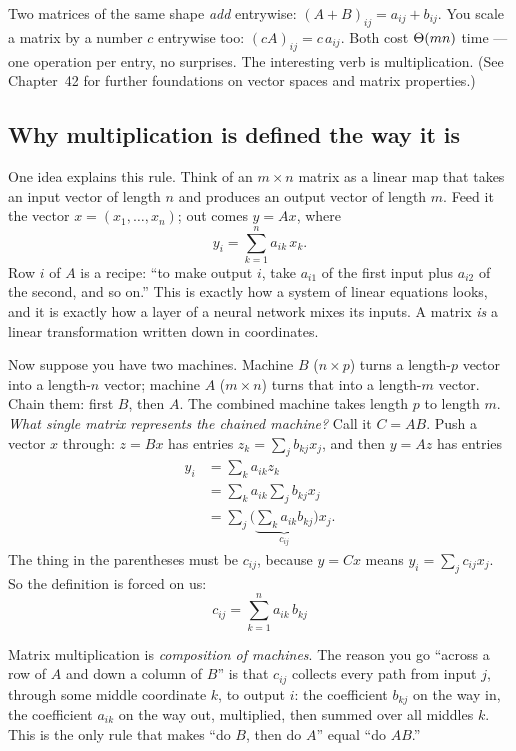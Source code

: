Two matrices of the same shape \emph{add} entrywise: $(A+B)_{ij}=a_{ij}+b_{ij}$.
You scale a matrix by a number $c$ entrywise too: $(cA)_{ij}=c\,a_{ij}$. Both cost
$\Theta(mn)$ time --- one operation per entry, no surprises. The interesting verb is
multiplication. (See Chapter~42 for further foundations on vector spaces and matrix properties.)

\subsection{Why multiplication is defined the way it is}

One idea explains this rule. Think of an
$m\times n$ matrix as a linear map
that takes an input vector of length $n$ and produces an output vector of
length $m$. Feed it the vector
$x=(x_1,\dots,x_n)$; out comes $y=Ax$, where
$$
y_i=\sum_{k=1}^{n} a_{ik}\,x_k .
$$
Row $i$ of $A$ is a recipe: ``to make output $i$, take $a_{i1}$ of the first
input plus $a_{i2}$ of the second, and so on.'' This is exactly how a system of
linear equations looks, and it is exactly how a layer of a neural network mixes
its inputs. A matrix \emph{is} a linear transformation written down in
coordinates.

Now suppose you have two machines. Machine $B$ ($n\times p$) turns a length-$p$
vector into a length-$n$ vector; machine $A$ ($m\times n$) turns that into a
length-$m$ vector. Chain them: first $B$, then $A$. The combined machine takes
length $p$ to length $m$. \emph{What single matrix represents the chained
machine?} Call it $C=AB$. Push a vector $x$ through: $z=Bx$ has entries
$z_k=\sum_j b_{kj}x_j$, and then $y=Az$ has entries
\begin{align*}
y_i &= \sum_{k} a_{ik}z_k \\
    &= \sum_{k}a_{ik}\sum_{j}b_{kj}x_j \\
    &= \sum_{j}\Big(\underbrace{\sum_{k}a_{ik}b_{kj}}_{c_{ij}}\Big)x_j .
\end{align*}
The thing in the parentheses must be $c_{ij}$, because $y=Cx$ means
$y_i=\sum_j c_{ij}x_j$. So the definition is forced on us:
$$
\boxed{\,c_{ij}=\sum_{k=1}^{n}a_{ik}\,b_{kj}\,}
$$

\begin{intuitionbox}
Matrix multiplication is \emph{composition of machines}. The reason you go
``across a row of $A$ and down a column of $B$'' is that $c_{ij}$ collects every
path from input $j$, through some middle coordinate $k$, to output $i$: the
coefficient $b_{kj}$ on the way in, the coefficient $a_{ik}$ on the way out,
multiplied, then summed over all middles $k$. This is
the only rule that makes ``do $B$, then do $A$'' equal ``do $AB$.''
\end{intuitionbox}

